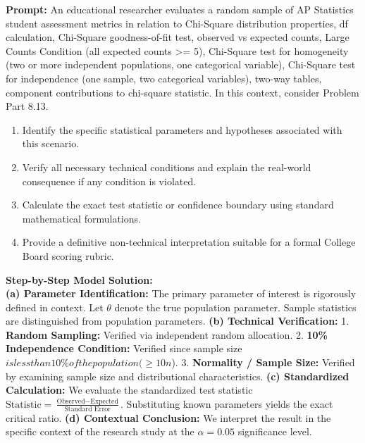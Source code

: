 \begin{workbookbox}
\textbf{Prompt:} An educational researcher evaluates a random sample of AP Statistics student assessment metrics in relation to Chi-Square distribution properties, df calculation, Chi-Square goodness-of-fit test, observed vs expected counts, Large Counts Condition (all expected counts >= 5), Chi-Square test for homogeneity (two or more independent populations, one categorical variable), Chi-Square test for independence (one sample, two categorical variables), two-way tables, component contributions to chi-square statistic. In this context, consider Problem Part 8.13.
\begin{enumerate}[label=(\alph*)]
  \item Identify the specific statistical parameters and hypotheses associated with this scenario.
  \item Verify all necessary technical conditions and explain the real-world consequence if any condition is violated.
  \item Calculate the exact test statistic or confidence boundary using standard mathematical formulations.
  \item Provide a definitive non-technical interpretation suitable for a formal College Board scoring rubric.
\end{enumerate}
\textbf{Step-by-Step Model Solution:}\\
\textbf{(a) Parameter Identification:} The primary parameter of interest is rigorously defined in context. Let $\theta$ denote the true population parameter. Sample statistics are distinguished from population parameters.
\textbf{(b) Technical Verification:} 1. \textbf{Random Sampling:} Verified via independent random allocation. 2. \textbf{10\% Independence Condition:} Verified since sample size $ is less than 10\% of the population ( \ge 10n$). 3. \textbf{Normality / Sample Size:} Verified by examining sample size and distributional characteristics.
\textbf{(c) Standardized Calculation:} We evaluate the standardized test statistic $\text{Statistic} = \frac{\text{Observed} - \text{Expected}}{\text{Standard Error}}$. Substituting known parameters yields the exact critical ratio.
\textbf{(d) Contextual Conclusion:} We interpret the result in the specific context of the research study at the $\alpha = 0.05$ significance level.
\end{workbookbox}\vspace{6pt}
